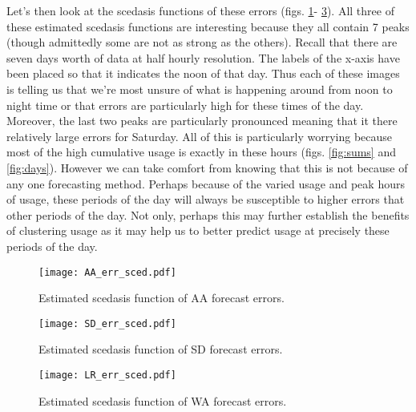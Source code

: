 Let's then look at the scedasis functions of these errors (figs. \ref{fig:AA_err_sced}- \ref{fig:LR_err_sced}). All three of these estimated scedasis functions are interesting because they all contain 7 peaks (though admittedly some are not as strong as the others). Recall that there are seven days worth of data at half hourly resolution. The labels of the x-axis have been placed so that it indicates the noon of that day. Thus each of these images is telling us that we're most unsure of what is happening around from noon to night time or that errors are particularly high for these times of the day. Moreover, the last two peaks are particularly pronounced meaning that it there relatively large errors for Saturday. All of this is particularly worrying because most of the high cumulative usage is exactly in these hours (figs. \ref{fig:sums} and \ref{fig:days}). However we can take comfort from knowing that this is not because of any one forecasting method. Perhaps because of the varied usage and peak hours of usage, these periods of the day will always be susceptible to higher errors that other periods of the day. Not only, perhaps this may further establish the benefits of clustering usage as it may help us to better predict usage at precisely these periods of the day.

\begin{figure}
\centering
\texttt{[image: AA\_err\_sced.pdf]}
\caption{\label{fig:AA_err_sced} Estimated scedasis function of AA forecast errors.}
\end{figure}

\begin{figure}
\centering
\texttt{[image: SD\_err\_sced.pdf]}
\caption{\label{fig:SD_err_sced} Estimated scedasis function of SD forecast errors.}
\end{figure}

\begin{figure}
\centering
\texttt{[image: LR\_err\_sced.pdf]}
\caption{\label{fig:LR_err_sced} Estimated scedasis function of WA forecast errors.}
\end{figure}

